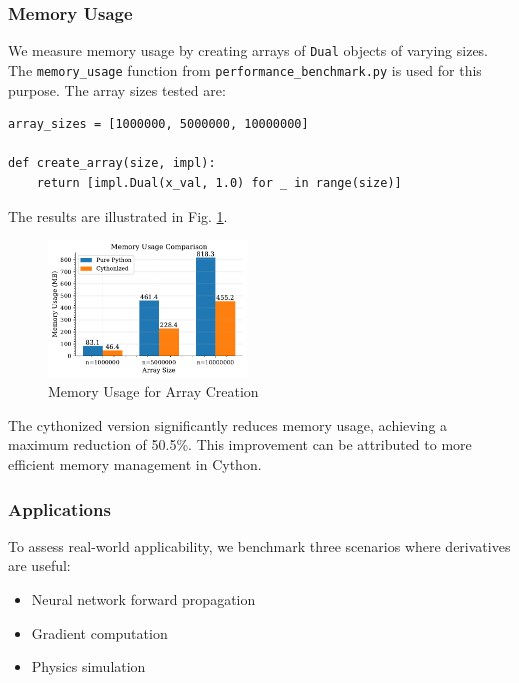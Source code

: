 \documentclass{article}
\begin{document}
\subsubsection*{Memory Usage}

We measure memory usage by creating arrays of \texttt{Dual} objects of varying sizes. The \texttt{memory\_usage} function from \texttt{performance\_benchmark.py} is used for this purpose. The array sizes tested are:

\begin{lstlisting}[style=pythonstyle]
array_sizes = [1000000, 5000000, 10000000]

def create_array(size, impl):
    return [impl.Dual(x_val, 1.0) for _ in range(size)]
\end{lstlisting}

The results are illustrated in Fig. \ref{fig:mu}.

\begin{figure}[!htbp]
\centering
\includegraphics[width=0.47\textwidth]{./images/memory_usage.pdf}
\caption{Memory Usage for Array Creation}
\label{fig:mu}
\end{figure}

The cythonized version significantly reduces memory usage, achieving a maximum reduction of 50.5\%. This improvement can be attributed to more efficient memory management in Cython.

\subsubsection*{Applications}

To assess real-world applicability, we benchmark three scenarios where derivatives are useful:

\begin{itemize} 
\item Neural network forward propagation 
\item Gradient computation 
\item Physics simulation 
\end{itemize}
\end{document}
